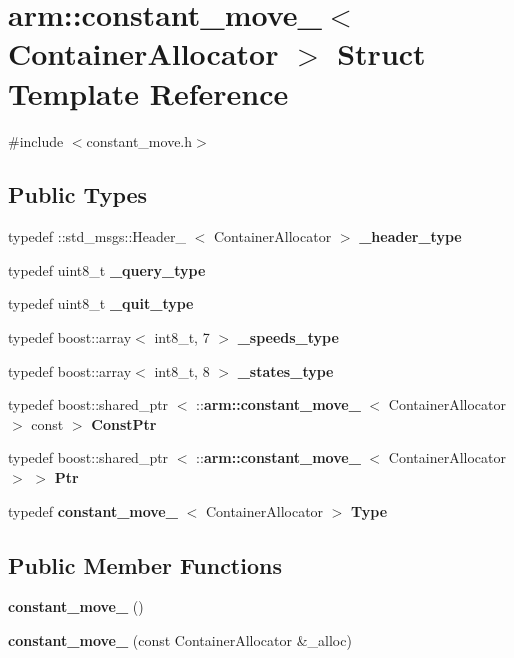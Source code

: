 \section{arm\-:\-:constant\-\_\-move\-\_\-$<$ \-Container\-Allocator $>$ \-Struct \-Template \-Reference}
\label{structarm_1_1constant__move__}


{\ttfamily \#include $<$constant\-\_\-move.\-h$>$}

\subsection*{\-Public \-Types}
\begin{DoxyCompactItemize}
\item 
typedef \-::std\-\_\-msgs\-::\-Header\-\_\-\*
$<$ \-Container\-Allocator $>$ {\bf \-\_\-header\-\_\-type}
\item 
typedef uint8\-\_\-t {\bf \-\_\-query\-\_\-type}
\item 
typedef uint8\-\_\-t {\bf \-\_\-quit\-\_\-type}
\item 
typedef boost\-::array$<$ int8\-\_\-t, 7 $>$ {\bf \-\_\-speeds\-\_\-type}
\item 
typedef boost\-::array$<$ int8\-\_\-t, 8 $>$ {\bf \-\_\-states\-\_\-type}
\item 
typedef boost\-::shared\-\_\-ptr\*
$<$ \-::{\bf arm\-::constant\-\_\-move\-\_\-}\*
$<$ \-Container\-Allocator $>$ const  $>$ {\bf \-Const\-Ptr}
\item 
typedef boost\-::shared\-\_\-ptr\*
$<$ \-::{\bf arm\-::constant\-\_\-move\-\_\-}\*
$<$ \-Container\-Allocator $>$ $>$ {\bf \-Ptr}
\item 
typedef {\bf constant\-\_\-move\-\_\-}\*
$<$ \-Container\-Allocator $>$ {\bf \-Type}
\end{DoxyCompactItemize}
\subsection*{\-Public \-Member \-Functions}
\begin{DoxyCompactItemize}
\item 
{\bf constant\-\_\-move\-\_\-} ()
\item 
{\bf constant\-\_\-move\-\_\-} (const \-Container\-Allocator \&\-\_\-alloc)
\end{DoxyCompactItemize}

